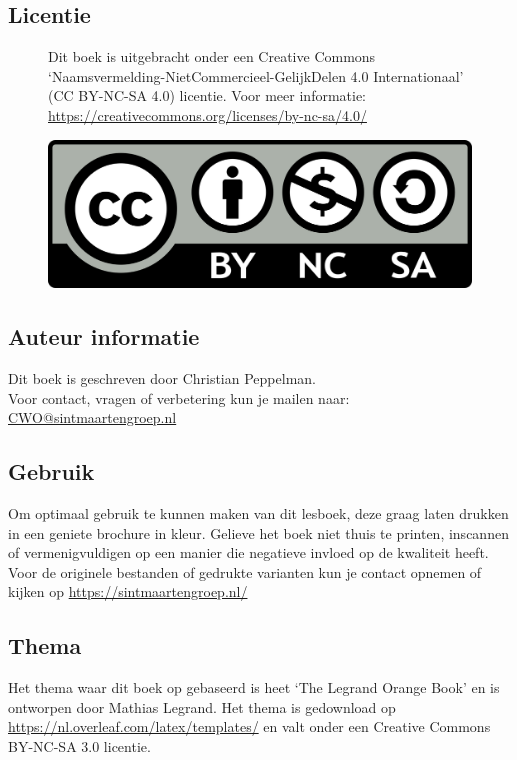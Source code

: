 \subsection*{Licentie}
\begin{figure}[H]
	\centering
	\begin{minipage}[t]{0.60\textwidth}
		\vspace{-1.80cm}
		Dit boek is uitgebracht onder een Creative Commons
		`Naamsvermelding-NietCommercieel-GelijkDelen 4.0 Internationaal' (CC BY-NC-SA 4.0) licentie. Voor meer informatie: \url{https://creativecommons.org/licenses/by-nc-sa/4.0/}
	\end{minipage}
	\hfill
	\begin{minipage}[b]{0.35\textwidth}
	\includegraphics[width=\textwidth]{../Hoofdstukken/Informatie/CC-BY-NC-SA.png}
\end{minipage}
\end{figure}
\subsection*{Auteur informatie}
Dit boek is geschreven door Christian Peppelman.\\ 
Voor contact, vragen of verbetering kun je mailen naar: \href{mailto:cwo@sintmaartengroep.nl}{CWO@sintmaartengroep.nl} 
\subsection*{Gebruik}
Om optimaal gebruik te kunnen maken van dit lesboek, deze graag laten drukken in een geniete brochure in kleur. Gelieve het boek niet thuis te printen, inscannen of vermenigvuldigen op een manier die negatieve invloed op de kwaliteit heeft. Voor de originele bestanden of gedrukte varianten kun je contact opnemen of kijken op \url{https://sintmaartengroep.nl/}
\subsection*{Thema}
Het thema waar dit boek op gebaseerd is heet `The Legrand Orange Book' en is ontworpen door Mathias Legrand. Het thema is gedownload op \url{https://nl.overleaf.com/latex/templates/} en valt onder een Creative Commons BY-NC-SA 3.0 licentie.
